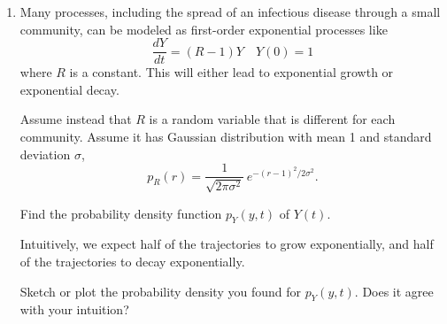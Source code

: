 \documentclass[12pt,letterpaper]{article}
\begin{document}
 

\begin{enumerate}







\item Many processes, including the spread of an infectious disease through a small community, can be modeled as first-order exponential processes like 
\begin{equation*}
\frac{dY}{dt} = \left(R-1\right) Y \quad Y(0)=1
\end{equation*}
where $R$ is a constant. This will either lead to exponential growth or exponential decay.

Assume instead that $R$ is a random variable that is different for each community. Assume it has Gaussian distribution with mean 1 and standard deviation $\sigma$,
\begin{equation*}
p_R(r) = \frac{1}{\sqrt{2\pi \sigma^2}}\, e^{-\left(r-1\right)^2/2\sigma^2}.
\end{equation*}

Find the probability density function $p_Y(y,t)$ of $Y(t)$.

Intuitively, we expect half of the trajectories to grow exponentially, and half of the trajectories to decay exponentially. 

Sketch or plot the probability density you found for $p_Y(y,t)$. Does it agree with your intuition?


\end{enumerate}
\end{document}
